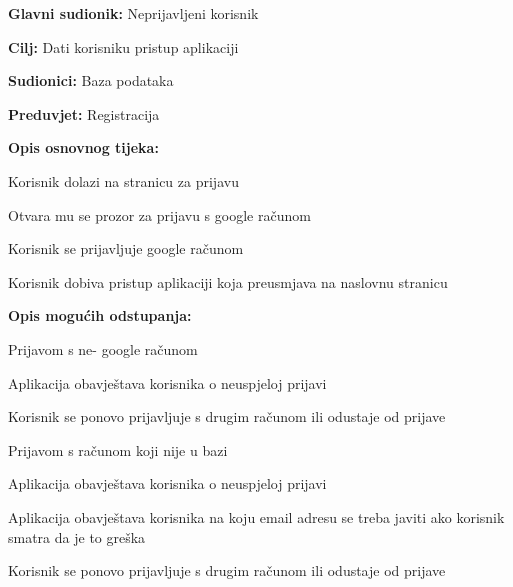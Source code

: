 					\noindent {}
					\begin{packed_item}
	
						\item \textbf{Glavni sudionik:} Neprijavljeni korisnik
						\item \textbf{Cilj:} Dati korisniku pristup aplikaciji
						\item \textbf{Sudionici:} Baza podataka
						\item \textbf{Preduvjet:} Registracija
						\item \textbf{Opis osnovnog tijeka:}
						
						\item[] \begin{packed_enum}
	
							\item Korisnik dolazi na stranicu za prijavu
							\item Otvara mu se prozor za prijavu s google računom
							\item Korisnik se prijavljuje google računom
							\item Korisnik dobiva pristup aplikaciji koja preusmjava na naslovnu stranicu
						\end{packed_enum}
						
						\item \textbf{Opis mogućih odstupanja:}

						\item[] \begin{packed_item}

							\item[2.a] Prijavom s ne- google računom
							\item[] \begin{packed_enum}

								\item Aplikacija obavještava korisnika o neuspjeloj prijavi
								\item Korisnik se ponovo prijavljuje s drugim računom ili odustaje od prijave

							\end{packed_enum}

							\item[2.b] Prijavom s računom koji nije u bazi
							\item[] \begin{packed_enum}

								\item Aplikacija obavještava korisnika o neuspjeloj prijavi
								\item Aplikacija obavještava korisnika na koju email adresu se treba javiti ako korisnik smatra da je to greška
								\item Korisnik se ponovo prijavljuje s drugim računom ili odustaje od prijave

							\end{packed_enum}

						\end{packed_item}
					\end{packed_item}

